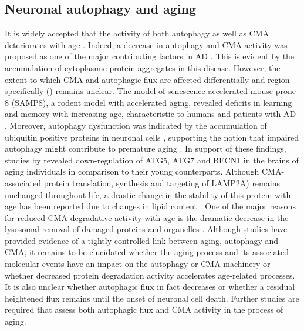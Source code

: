 \subsection{Neuronal autophagy and aging}
It is widely accepted that the activity of both autophagy as well as CMA deteriorates with age \citep{Cuervo2005}. Indeed, a decrease in autophagy and CMA activity was proposed as one of the major contributing factors in AD \citep{Cuervo2005}. This is evident by the accumulation of cytoplasmic protein aggregates in this disease. However, the extent to which CMA and autophagic flux are affected differentially and region-specifically () remains unclear. The model of senescence-accelerated mouse-prone 8 (SAMP8), a rodent model with accelerated aging, revealed deficits in learning and memory with increasing age, characteristic to humans and patients with AD \citep{Ma2011}. Moreover, autophagy dysfunction was indicated by the accumulation of ubiquitin positive proteins in neuronal cells \citep{Ma2011}, supporting the notion that impaired autophagy might contribute to premature aging \citep{Vellai2003}. In support of these findings, studies by \citet{Lipinski2010} revealed down-regulation of ATG5, ATG7 and BECN1 in the brains of aging individuals in comparison to their young counterparts. Although CMA-associated protein translation, synthesis and targeting of LAMP2A) remains unchanged throughout life, a drastic change in the stability of this protein with age has been reported due to changes in lipid content \citep{Cuervo2014}. One of the major reasons for reduced CMA degradative activity with age is the dramatic decrease in the lysosomal removal of damaged proteins and organelles \citep{Massey2006}. Although studies have provided evidence of a tightly controlled link between aging, autophagy and CMA, it remains to be elucidated whether the aging process and its associated molecular events have an impact on the autophagy or CMA machinery or whether decreased protein degradation activity accelerates age-related processes. It is also unclear whether autophagic flux in fact decreases or whether a residual heightened flux remains until the onset of neuronal cell death. Further studies are required that assess both autophagic flux and CMA activity in the process of aging. 

